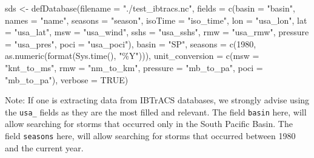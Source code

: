 \documentclass[
]{article}
\newenvironment{Shaded}{\begin{snugshade}}{\end{snugshade}}
\newcommand{\AttributeTok}[1]{\textcolor[rgb]{0.77,0.63,0.00}{#1}}
\newcommand{\ConstantTok}[1]{\textcolor[rgb]{0.00,0.00,0.00}{#1}}
\newcommand{\DecValTok}[1]{\textcolor[rgb]{0.00,0.00,0.81}{#1}}
\newcommand{\FunctionTok}[1]{\textcolor[rgb]{0.00,0.00,0.00}{#1}}
\newcommand{\NormalTok}[1]{#1}
\newcommand{\OtherTok}[1]{\textcolor[rgb]{0.56,0.35,0.01}{#1}}
\newcommand{\StringTok}[1]{\textcolor[rgb]{0.31,0.60,0.02}{#1}}
\begin{document}
\begin{Shaded}
\begin{Highlighting}[]
\NormalTok{sds }\OtherTok{\textless{}{-}} \FunctionTok{defDatabase}\NormalTok{(}\AttributeTok{filename =} \StringTok{"./test\_ibtracs.nc"}\NormalTok{,}
                   \AttributeTok{fields =} \FunctionTok{c}\NormalTok{(}\AttributeTok{basin =} \StringTok{"basin"}\NormalTok{,}
                              \AttributeTok{names =} \StringTok{"name"}\NormalTok{,}
                              \AttributeTok{seasons =} \StringTok{"season"}\NormalTok{,}
                              \AttributeTok{isoTime =} \StringTok{"iso\_time"}\NormalTok{,}
                              \AttributeTok{lon =} \StringTok{"usa\_lon"}\NormalTok{,}
                              \AttributeTok{lat =} \StringTok{"usa\_lat"}\NormalTok{,}
                              \AttributeTok{msw =} \StringTok{"usa\_wind"}\NormalTok{,}
                              \AttributeTok{sshs =} \StringTok{"usa\_sshs"}\NormalTok{,}
                              \AttributeTok{rmw =} \StringTok{"usa\_rmw"}\NormalTok{,}
                              \AttributeTok{pressure =} \StringTok{"usa\_pres"}\NormalTok{,}
                              \AttributeTok{poci =} \StringTok{"usa\_poci"}\NormalTok{),}
                   \AttributeTok{basin =} \StringTok{"SP"}\NormalTok{,}
                   \AttributeTok{seasons =} \FunctionTok{c}\NormalTok{(}\DecValTok{1980}\NormalTok{, }\FunctionTok{as.numeric}\NormalTok{(}\FunctionTok{format}\NormalTok{(}\FunctionTok{Sys.time}\NormalTok{(), }\StringTok{"\%Y"}\NormalTok{))),}
                   \AttributeTok{unit\_conversion =} \FunctionTok{c}\NormalTok{(}\AttributeTok{msw =} \StringTok{"knt\_to\_ms"}\NormalTok{,}
                                       \AttributeTok{rmw =} \StringTok{"nm\_to\_km"}\NormalTok{,}
                                       \AttributeTok{pressure =} \StringTok{"mb\_to\_pa"}\NormalTok{,}
                                       \AttributeTok{poci =} \StringTok{"mb\_to\_pa"}\NormalTok{),}
                   \AttributeTok{verbose =} \ConstantTok{TRUE}\NormalTok{)}
\end{Highlighting}
\end{Shaded}

Note: If one is extracting data from IBTrACS databases, we strongly
advise using the \texttt{usa\_} fields as they are the most filled and
relevant. The field \texttt{basin} here, will allow searching for storms
that occurred only in the South Pacific Basin. The field
\texttt{seasons} here, will allow searching for storms that occurred
between 1980 and the current year.
\end{document}
